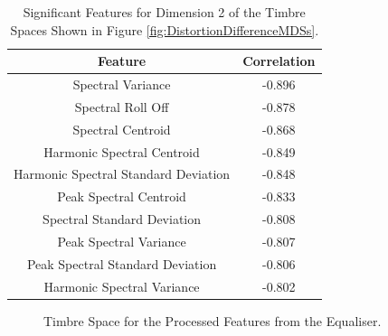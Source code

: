 		\begin{table}[h!]
			\centering
			\begin{tabular}{|c|c|}
				\hline
				\bf{Feature} & \bf{Correlation} \\
				\hline
				\hline
				Spectral Variance & -0.896 \\
				\hline
				Spectral Roll Off & -0.878 \\
				\hline
				Spectral Centroid & -0.868 \\
				\hline
				Harmonic Spectral Centroid & -0.849 \\
				\hline
				Harmonic Spectral Standard Deviation & -0.848 \\
				\hline
				Peak Spectral Centroid & -0.833 \\
				\hline
				Spectral Standard Deviation & -0.808 \\
				\hline
				Peak Spectral Variance & -0.807 \\
				\hline
				Peak Spectral Standard Deviation & -0.806 \\
				\hline
				Harmonic Spectral Variance & -0.802 \\
				\hline
			\end{tabular}
			\caption{Significant Features for Dimension 2 of the Timbre Spaces Shown in Figure 
				 \ref{fig:DistortionDifferenceMDSs}.}
			\label{tab:DistortionDifferenceFeaturesDim2}
		\end{table}

		\begin{figure}[h!]
			\centering
			\qquad
			\caption{Timbre Space for the Processed Features from the Equaliser.}
			\label{fig:EqualiserProcessedMDSs}
		\end{figure}

